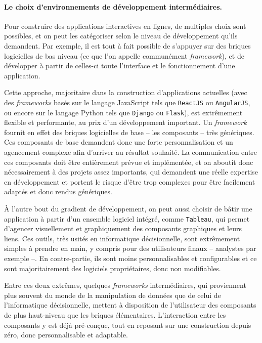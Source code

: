 \paragraph{Le choix d'environnements de développement intermédiaires.}
Pour construire des applications interactives en lignes, de multiples choix sont possibles, et on peut les catégoriser selon le niveau de développement qu'ils demandent.
Par exemple, il est tout à fait possible de s'appuyer sur des briques logicielles de bas niveau (ce que l'on appelle communément \textit{framework}), et de développer à partir de celles-ci toute l'interface et le fonctionnement d'une application.

Cette approche, majoritaire dans la construction d'applications actuelles (avec des \textit{frameworks} basés sur le langage JavaScript tels que \texttt{ReactJS} ou \texttt{AngularJS}, ou encore sur le langage Python tels que \texttt{Django} ou \texttt{Flask}), est extrêmement flexible et performante, au prix d'un développement important.
Un \textit{framework} fournit en effet des \og briques\fg{} logicielles de base -- les composants -- très génériques.
Ces composants de base demandent donc une forte personnalisation et un agencement complexe afin d'arriver au résultat souhaité.
La communication entre ces composants doit être entièrement prévue et implémentée, et on aboutit donc nécessairement à des projets assez importants, qui demandent une réelle expertise en développement et portent le risque d'être trop complexes pour être facilement adaptés et donc rendus génériques.

À l'autre bout du gradient de développement, on peut aussi choisir de bâtir une application à partir d'un ensemble logiciel intégré, comme \texttt{Tableau}, qui permet d'agencer visuellement et graphiquement des composants graphiques et leurs liens.
Ces outils, très usités en informatique décisionnelle, sont extrêmement simples à prendre en main, y compris pour des \og utilisateurs finaux\fg{} -- analystes par exemple --.
En contre-partie, ils sont moins personnalisables et configurables et ce sont majoritairement des logiciels propriétaires, donc non modifiables.

Entre ces deux extrêmes, quelques \textit{frameworks} intermédiaires, qui proviennent plus souvent du monde de la manipulation de données que de celui de l'informatique décisionnelle, mettent à disposition de l'utilisateur des composants de plus haut-niveau que les \og briques élémentaires\fg{}.
L'interaction entre les composants y est déjà pré-conçue, tout en reposant sur une construction \og depuis zéro\fg{}, donc personnalisable et adaptable.

